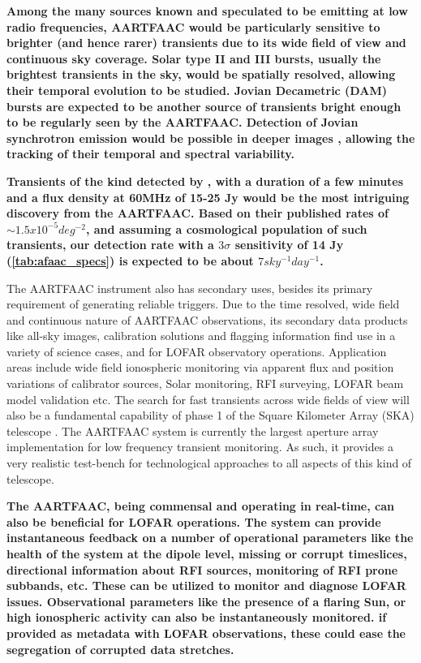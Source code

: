 \documentclass{ws-jai}
\begin{document}
\textbf {Among the many sources known and speculated to be emitting at low radio
  frequencies, AARTFAAC would  be particularly sensitive to  brighter (and hence
  rarer) transients due  to its wide field of view  and continuous sky coverage.
  Solar type  II and III  bursts, usually the  brightest transients in  the sky,
  would be spatially resolved, allowing  their temporal evolution to be studied.
  Jovian Decametric (DAM) bursts are expected to be another source of transients
  bright  enough to  be regularly  seen by  the AARTFAAC.   Detection of  Jovian
  synchrotron    emission     would    be    possible    in     deeper    images
  \citep{girard2012jupiter,zarka2004fast},  allowing   the  tracking   of  their
  temporal and spectral variability.}

\textbf{ Transients  of the  kind detected  by \citep{stewart2016lofar},  with a
  duration of a few minutes and a flux density at 60MHz of 15-25 Jy would be the
  most intriguing discovery from the AARTFAAC. Based on their published rates of
  $\sim1.5x10^{-5}  deg^{-2}$, and  assuming a  cosmological population  of such
  transients,  our  detection  rate  with  a  $3\sigma$  sensitivity  of  14  Jy
  (\ref{tab:afaac_specs}) is expected to be about $7 sky^{-1}day^{-1}$.}
       
The AARTFAAC instrument also has secondary uses, besides its primary requirement
of  generating reliable  triggers.  Due  to the  time resolved,  wide field  and
continuous nature  of AARTFAAC  observations, its  secondary data  products like
all-sky images,  calibration solutions  and flagging information  find use  in a
variety of  science cases,  and for  LOFAR observatory  operations.  Application
areas include wide  field ionospheric monitoring via apparent  flux and position
variations of  calibrator sources, Solar  monitoring, RFI surveying,  LOFAR beam
model validation etc. The search for  fast transients across wide fields of view
will also be a  fundamental capability of phase 1 of  the Square Kilometer Array
(SKA) telescope \cite{colegate2011searching}.  The  AARTFAAC system is currently
the  largest   aperture  array   implementation  for  low   frequency  transient
monitoring. As such,  it provides a very realistic  test-bench for technological
approaches to all aspects of this kind of telescope.

\textbf {The AARTFAAC,  being commensal and operating in real-time,  can also be
  beneficial  for  LOFAR  operations.   The  system  can  provide  instantaneous
  feedback on a  number of operational parameters like the  health of the system
  at the  dipole level, missing  or corrupt timeslices,  directional information
  about  RFI sources,  monitoring  of RFI  prone subbands,  etc.   These can  be
  utilized to monitor and diagnose  LOFAR issues.  Observational parameters like
  the  presence of  a  flaring Sun,  or  high ionospheric  activity  can also  be
  instantaneously monitored.   if provided as metadata  with LOFAR observations,
  these could ease the segregation of corrupted data stretches.}
\end{document}
